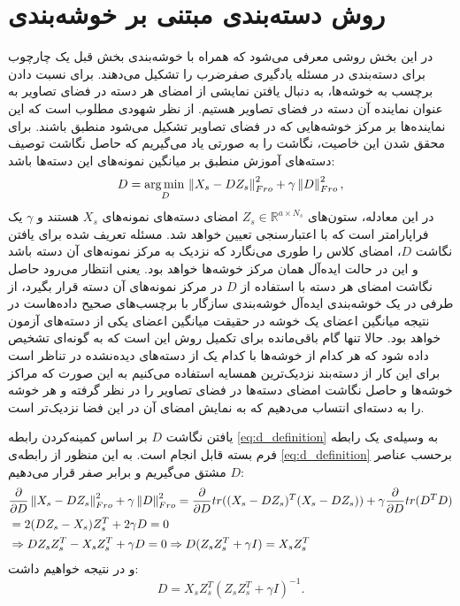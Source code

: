 \section{روش دسته‌بندی مبتنی بر خوشه‌بندی} \label{simple_method}
در این بخش روشی معرفی می‌شود که همراه با خوشه‌بندی بخش قبل یک چارچوب برای دسته‌بندی در مسئله یادگیری صفرضرب را تشکیل می‌دهند. برای نسبت دادن برچسب به خوشه‌ها، به دنبال یافتن نمایشی از امضای هر دسته در فضای تصاویر به عنوان نماینده آن دسته در فضای تصاویر هستیم. از نظر شهودی مطلوب است که این نماینده‌ها بر مرکز خوشه‌هایی که در فضای تصاویر تشکیل می‌شود منطبق باشند. برای محقق شدن این خاصیت، نگاشت را به صورتی یاد می‌گیریم که حاصل نگاشت توصیف دسته‌های آموزش منطبق بر میانگین نمونه‌های این دسته‌ها باشد:
\begin{equation} \label{eq:d_definition}
  D = \operatorname*{arg\,min\,}_D \left \lVert X_s - D Z_s \right \rVert_{Fro}^2 + \gamma \left \lVert D \right \rVert_{Fro}^2,
\end{equation}
در این معادله، ستون‌های
 $Z_s \in \mathbb{R}^{a \times N_s}$
  امضای دسته‌های نمونه‌های $X_s$ هستند و $\gamma$ یک فراپارامتر است که با اعتبارسنجی تعیین خواهد شد. مسئله تعریف شده برای یافتن نگاشت $D$، امضای کلاس را طوری می‌نگارد که نزدیک به مرکز نمونه‌های آن دسته باشد و این در حالت ایده‌آل همان مرکز خوشه‌ها خواهد بود. یعنی انتظار می‌رود
  حاصل نگاشت امضای هر دسته با استفاده از $D$ در مرکز نمونه‌های آن دسته قرار بگیرد، از طرفی در یک خوشه‌بندی ایده‌آل خوشه‌بندی سازگار با برچسب‌های صحیح داده‌هاست در نتیجه میانگین اعضای یک خوشه در حقیقت میانگین اعضای یکی از دسته‌های آزمون خواهد بود. حالا تنها گام باقی‌مانده برای تکمیل روش این است که به گونه‌ای تشخیص داده شود که هر کدام از خوشه‌ها با کدام یک از دسته‌های دیده‌نشده در تناظر است برای این کار از دسته‌بند نزدیک‌ترین همسایه استفاده می‌کنیم به این صورت که مراکز خوشه‌ها و حاصل نگاشت امضای دسته‌ها در فضای تصاویر را در نظر گرفته و هر خوشه را به دسته‌ای انتساب می‌دهیم که به نمایش  امضای آن در این فضا نزدیک‌تر است.

یافتن نگاشت $D$ بر اساس  کمینه‌کردن رابطه
  \eqref{eq:d_definition}
  به وسیله‌ی یک رابطه فرم بسته قابل انجام است.
  به این منظور از رابطه‌ی \eqref{eq:d_definition} برحسب عناصر $D$ مشتق می‌گیریم و برابر صفر قرار می‌دهیم:
  \begin{align*}
  &\frac{\partial}{\partial D} \left \lVert X_s - D Z_s \right \rVert_{Fro}^2 + \gamma \left \lVert D \right \rVert_{Fro}^2 =
    \frac{\partial} {\partial D}tr((X_s -DZ_s)^T (X_s-DZ_s)) + \gamma \frac{\partial}{\partial D}tr(D^TD) \\
& = 2(DZ_s - X_s)Z_s^T + 2 \gamma D =0 \\
&\Rightarrow  DZ_sZ_s^T -  X_sZ_s^T + \gamma D =0 \Rightarrow D(Z_sZ_s^T + \gamma I) =  X_sZ_s^T
  \end{align*}
  و در نتیجه خواهیم داشت:
  \begin{equation} \label{eq:d_answer}
  D = X_s Z_s^T (Z_s Z_s^T + \gamma I)^{-1}.
\end{equation}

